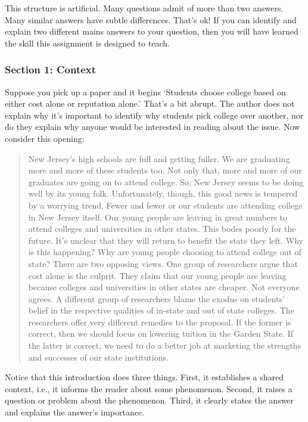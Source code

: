 \documentclass[oneside]{article}
\begin{document}
This structure is artificial. Many questions admit of more than two
answers. Many similar answers have subtle differences. That's ok! If you
can identify and explain two different mains answers to your question,
then you will have learned the skill this assignment is designed to
teach.

\subsubsection{Section 1: Context}\label{section-1-context}

Suppose you pick up a paper and it begins `Students choose college based
on either cost alone or reputation alone.' That's a bit abrupt. The
author does not explain why it's important to identify why students pick
college over another, nor do they explain why anyone would be interested
in reading about the issue. Now consider this opening:

\begin{quote}
New Jersey's high schools are full and getting fuller. We are graduating
more and more of these students too. Not only that, more and more of our
graduates are going on to attend college. So, New Jersey seems to be
doing well by its young folk. Unfortunately, though, this good news is
tempered by a worrying trend. Fewer and fewer or our students are
attending college in New Jersey itself. Our young people are leaving in
great numbers to attend colleges and universities in other states. This
bodes poorly for the future. It's unclear that they will return to
benefit the state they left. Why is this happening? Why are young people
choosing to attend college out of state? There are two opposing views.
One group of researchers argue that cost alone is the culprit. They
claim that our young people are leaving because colleges and
universities in other states are cheaper. Not everyone agrees. A
different group of researchers blame the exodus on students' belief in
the respective qualities of in-state and out of state colleges. The
researchers offer very different remedies to the proposal. If the former
is correct, then we should focus on lowering tuition in the Garden
State. If the latter is correct, we need to do a better job at marketing
the strengths and successes of our state institutions.
\end{quote}

Notice that this introduction does three things. First, it establishes a
shared context, i.e., it informs the reader about some phenomenon.
Second, it raises a question or problem about the phenomenon. Third, it
clearly states the answer and explains the answer's importance.
\end{document}
